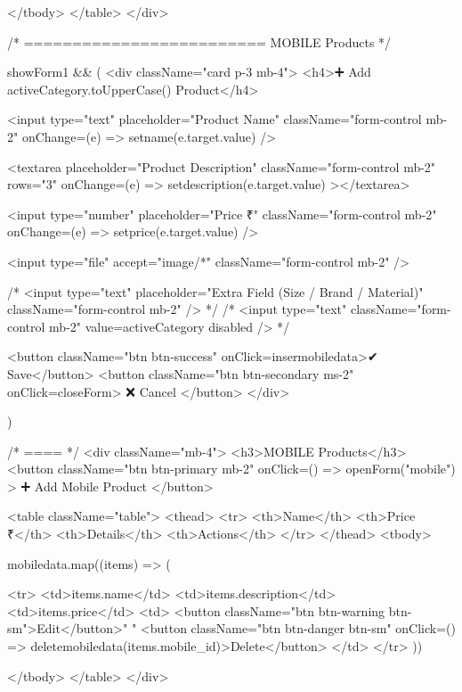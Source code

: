 {          </tbody>
        </table>
      </div>

      {/* ========================= MOBILE Products */}

      {showForm1 && (
        <div className="card p-3 mb-4">
          <h4>➕ Add {activeCategory.toUpperCase()} Product</h4>

          <input
            type="text"
            placeholder="Product Name"
            className="form-control mb-2" onChange={(e) => setname(e.target.value)}
          />

          <textarea
            placeholder="Product Description"
            className="form-control mb-2"
            rows="3" onChange={(e) => setdescription(e.target.value)}
          ></textarea>

          <input
            type="number"
            placeholder="Price ₹"
            className="form-control mb-2" onChange={(e) => setprice(e.target.value)}
          />

          <input
            type="file"
            accept="image/*"
            className="form-control mb-2"
          />


          {/* <input
                type="text"
                placeholder="Extra Field (Size / Brand / Material)"
                className="form-control mb-2"
              /> */}
          {/* 
                  <input
                    type="text"
                    className="form-control mb-2"
                    value={activeCategory}
                    disabled
                  /> */}

          <button className="btn btn-success" onClick={insermobiledata}>✔ Save</button>
          <button className="btn btn-secondary ms-2" onClick={closeForm}>
            ❌ Cancel
          </button>
        </div>

      )}
      {/* ==== */}
      <div className="mb-4">
        <h3>MOBILE Products</h3>
        <button
          className="btn btn-primary mb-2"
          onClick={() => openForm("mobile")}
        >
          ➕ Add Mobile Product
        </button>

        <table className="table">
          <thead>
            <tr>
              <th>Name</th>
              <th>Price ₹</th>
              <th>Details</th>
              <th>Actions</th>
            </tr>
          </thead>
          <tbody>
            {mobiledata.map((items) => (

              <tr>
                <td>{items.name}</td>
                <td>{items.description}</td>
                <td>{items.price}</td>
                <td>
                  <button className="btn btn-warning btn-sm">Edit</button>{" "}
                  <button className="btn btn-danger btn-sm" onClick={() => deletemobiledata(items.mobile_id)}>Delete</button>
                </td>
              </tr>
            ))}
          </tbody>
        </table>
      </div>


}
